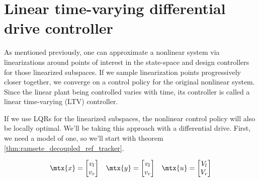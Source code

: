\section{Linear time-varying differential drive controller}

As mentioned previously, one can approximate a nonlinear system via
linearizations around points of interest in the state-space and design
controllers for those linearized subspaces. If we sample linearization points
progressively closer together, we converge on a control policy for the original
nonlinear system. Since the linear \gls{plant} being controlled varies with
time, its controller is called a linear time-varying (LTV) controller.

If we use LQRs for the linearized subspaces, the nonlinear control policy will
also be locally optimal. We'll be taking this approach with a differential
drive. First, we need a model of one, so we'll start with theorem
\ref{thm:ramsete_decoupled_ref_tracker}.

\begin{equation*}
  \begin{array}{ccc}
    \mtx{x} =
    \begin{bmatrix}
      v_l \\
      v_r
    \end{bmatrix} &
    \mtx{y} =
    \begin{bmatrix}
      v_l \\
      v_r
    \end{bmatrix} &
    \mtx{u} =
    \begin{bmatrix}
      V_l \\
      V_r
    \end{bmatrix}
  \end{array}
\end{equation*}

